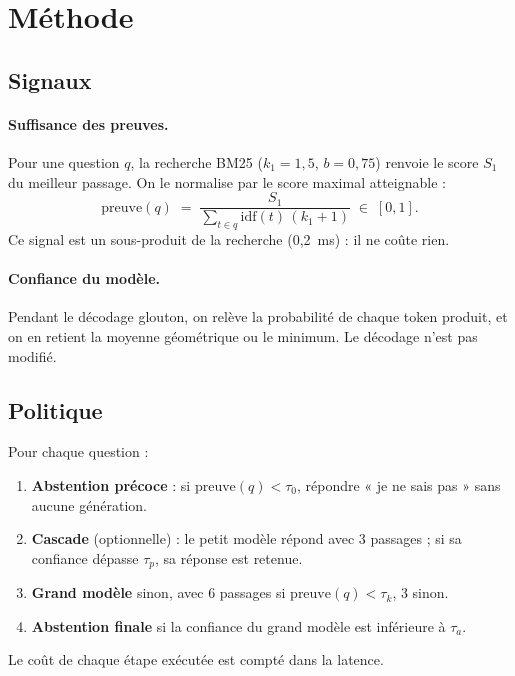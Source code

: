 \documentclass[11pt,a4paper]{article}
\begin{document}
\section{Méthode}\label{sec:methode}

\subsection{Signaux}

\paragraph{Suffisance des preuves.} Pour une question $q$, la recherche BM25 ($k_1=1{,}5$, $b=0{,}75$)
renvoie le score $S_1$ du meilleur passage. On le normalise par le score maximal atteignable :
\[
\text{preuve}(q) \;=\; \frac{S_1}{\sum_{t \in q} \mathrm{idf}(t)\,(k_1+1)} \;\in\; [0,1].
\]
Ce signal est un sous-produit de la recherche (0,2~ms) : il ne coûte rien.

\paragraph{Confiance du modèle.} Pendant le décodage glouton, on relève la probabilité de chaque token
produit, et on en retient la moyenne géométrique ou le minimum. Le décodage n'est pas modifié.

\subsection{Politique}

Pour chaque question :
\begin{enumerate}
\item \textbf{Abstention précoce} : si $\text{preuve}(q) < \tau_0$, répondre « je ne sais pas » sans
aucune génération.
\item \textbf{Cascade} (optionnelle) : le petit modèle répond avec 3 passages ; si sa confiance dépasse
$\tau_p$, sa réponse est retenue.
\item \textbf{Grand modèle} sinon, avec 6 passages si $\text{preuve}(q) < \tau_k$, 3 sinon.
\item \textbf{Abstention finale} si la confiance du grand modèle est inférieure à $\tau_a$.
\end{enumerate}
Le coût de chaque étape exécutée est compté dans la latence.
\end{document}

